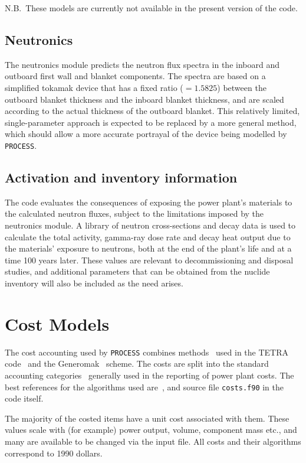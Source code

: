 \documentclass[11pt,a4paper]{report}
\newcommand{\process}{\mbox{\texttt{PROCESS}}}
\begin{document}
N.B.\ These models are currently not available in the present version of the
code.

\subsection{Neutronics}

The neutronics module predicts the neutron flux spectra in the inboard and
outboard first wall and blanket components. The spectra are based on a
simplified tokamak device that has a fixed ratio ($=1.5825$) between the
outboard blanket thickness and the inboard blanket thickness, and are scaled
according to the actual thickness of the outboard blanket. This relatively
limited, single-parameter approach is expected to be replaced by a more
general method, which should allow a more accurate portrayal of the device
being modelled by \process.

\subsection{Activation and inventory information}

The code evaluates the consequences of exposing the power plant's materials to
the calculated neutron fluxes, subject to the limitations imposed by the
neutronics module. A library of neutron cross-sections and decay data is used
to calculate the total activity, gamma-ray dose rate and decay heat output due
to the materials' exposure to neutrons, both at the end of the plant's life
and at a time 100 years later. These values are relevant to decommissioning
and disposal studies, and additional parameters that can be obtained from the
nuclide inventory will also be included as the need arises.

\section{Cost Models}

The cost accounting used by \process\/ combines methods~\cite{cost1} used in
the TETRA code~\cite{tetra} and the Generomak~\cite{generomak} scheme.  The
costs are split into the standard accounting categories~\cite{cost2} generally
used in the reporting of power plant costs. The best references for the
algorithms used are~\cite{storac}, and source file \texttt{costs.f90} in the
code itself.

The majority of the costed items have a unit cost associated with them. These
values scale with (for example) power output, volume, component mass etc., and
many are available to be changed via the input file. All costs and their
algorithms correspond to 1990 dollars.
\end{document}
